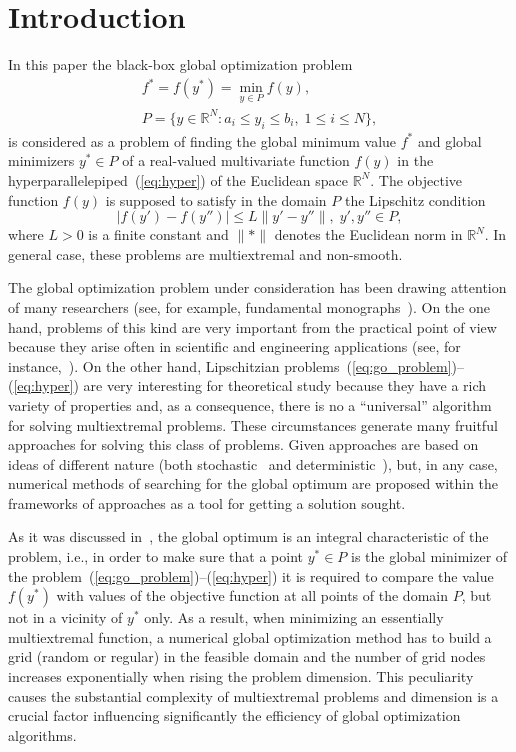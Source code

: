 \documentclass[preprint]{elsarticle}
\begin{document}
\section{Introduction}
In this paper the black-box global optimization problem
\begin{gather}
  \label{eq:go_problem}
  f^* = f(y^*) = \min_{y \in P} f(y), \\
  \label{eq:hyper}
  P = \{ y \in \mathbb{R}^N \colon a_i \leq y_i \leq b_i, \; 1 \leq i \leq N \},
\end{gather}
%
is considered as a problem of finding the global minimum value $f^*$ and global minimizers $y^* \in P$ of a real-valued multivariate function $f(y)$ in the hyperparallelepiped~(\ref{eq:hyper}) of the Euclidean space $\mathbb{R}^N$. The objective function $f(y)$ is supposed to satisfy in the domain $P$ the Lipschitz condition
\begin{equation}
  \label{eq:lipschitz}
  |f(y') - f(y'')| \leq L\| y' - y'' \|, \; y', y'' \in P,
\end{equation}
%
where $L > 0$ is a finite constant and $\|*\|$ denotes the Euclidean norm in $\mathbb{R}^N$. In general case, these problems are multiextremal and non-smooth.

The global optimization problem under consideration has been drawing attention of many researchers (see, for example, fundamental monographs~\cite{bib1,bib2,bib3,bib4,bib5,bib6}). On the one hand, problems of this kind are very important from the practical point of view because they arise often in scientific and engineering applications (see, for instance,~\cite{bib4,bib7,bib8,bib9,bib10,bib11,bib12,bib13}). On the other hand, Lipschitzian problems~(\ref{eq:go_problem})--(\ref{eq:hyper}) are very interesting for theoretical study because they have a rich variety of properties and, as a consequence, there is no a \enquote{universal} algorithm for solving multiextremal problems. These circumstances generate many fruitful approaches for solving this class of problems. Given approaches are based on ideas of different nature (both stochastic~\cite{bib5,bib6,bib14,bib16,bib17,bib18} and deterministic~\cite{bib19,bib20,bib21,bib22,bib23,bib24,bib25,bib26,bib27,bib28,bib29,bib30,bib46}), but, in any case, numerical methods of searching for the global optimum are proposed within the frameworks of approaches as a tool for getting a solution sought.

As it was discussed in~\cite{bib5}, the global optimum is an integral characteristic of the problem, i.e., in order to make sure that a point $y^* \in P$ is the global minimizer of the problem~(\ref{eq:go_problem})--(\ref{eq:hyper}) it is required to compare the value $f(y^*)$ with values of the objective function at all points of the domain $P$, but not in a vicinity of $y^*$ only. As a result, when minimizing an essentially multiextremal function, a numerical global optimization method has to build a grid (random or regular) in the feasible domain and the number of grid nodes increases exponentially when rising the problem dimension. This peculiarity causes the substantial complexity of multiextremal problems and dimension is a crucial factor influencing significantly the efficiency of global optimization algorithms.
\end{document}
